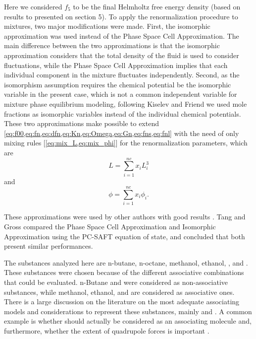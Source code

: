 \documentclass[preprint,12pt,3p]{elsarticle}
\begin{document}
Here we considered $f_{5}$ to be the final Helmholtz free energy density (based on results to presented on section 5).
To apply the renormalization procedure to mixtures, two major modifications were made.
First, the isomorphic approximation \citep{fisher1968renormalization} was used instead of the Phase Space Cell Approximation.
The main difference between the two approximations is that the isomorphic approximation considers that the total density of the fluid is used to consider fluctuations, while the Phase Space Cell Approximation implies that each individual component in the mixture fluctuates independently.
Second, as the isomorphism assumption requires the chemical potential be the isomorphic variable in the present case, which is not a common independent variable for mixture phase equilibrium modeling, following Kiselev and Friend \citep{kiselev1999cubic} we used mole fractions as isomorphic variables instead of the individual chemical potentials.
These two approximations make possible to extend \cref{eq:f00,eq:fn,eq:dfn,eq:Kn,eq:Omega,eq:Gn,eq:fns,eq:fnl} with the need of only mixing rules [\cref{eq:mix_L,eq:mix_phi}] for the renormalization parameters, which are
\begin{equation} \label{eq:mix_L}
L = \sum_{i=1}^{nc}x_{i}L_{i}^{3}
\end{equation}
and
\begin{equation} \label{eq:mix_phi}
\phi = \sum_{i=1}^{nc}x_{i}\phi_{i}.
\end{equation}

These approximations were used by other authors with good results \cite{cai2004thermodynamics,llovell2006global,sun2005application,pcm2017application,xu2011prediction}.
Tang and Gross \citep{tang2010renormalization} compared the Phase Space Cell Approximation and Isomorphic Approximation using the PC-SAFT equation of state, and concluded that both present similar performances.

The substances analyzed here are n-butane, n-octane, methanol, ethanol, , and .
These substances were chosen because of the different associative combinations that could be evaluated.
n-Butane and  were considered as non-associative substances, while methanol, ethanol, and  are considered as associative ones.
There is a large discussion on the literature on the most adequate associating models and considerations to represent these substances, mainly  \citep{bjorner2016modeling} and  \citep{ruffine2006represent}.
A common example is whether  should actually be considered as an associating molecule and, furthermore, whether the extent of quadrupole forces is important \cite{tsivintzelis2011modeling,bjorner2016modeling}.
\end{document}
